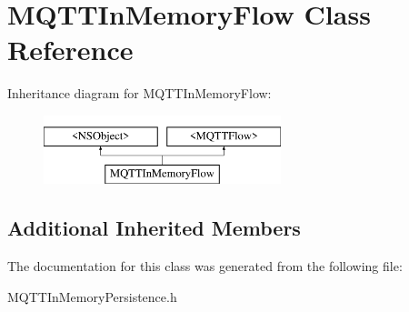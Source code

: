 \hypertarget{interface_m_q_t_t_in_memory_flow}{}\section{M\+Q\+T\+T\+In\+Memory\+Flow Class Reference}
\label{interface_m_q_t_t_in_memory_flow}
Inheritance diagram for M\+Q\+T\+T\+In\+Memory\+Flow\+:\begin{figure}[H]
\begin{center}
\leavevmode
\includegraphics[height=2.000000cm]{interface_m_q_t_t_in_memory_flow}
\end{center}
\end{figure}
\subsection*{Additional Inherited Members}


The documentation for this class was generated from the following file\+:\begin{DoxyCompactItemize}
\item 
M\+Q\+T\+T\+In\+Memory\+Persistence.\+h\end{DoxyCompactItemize}
